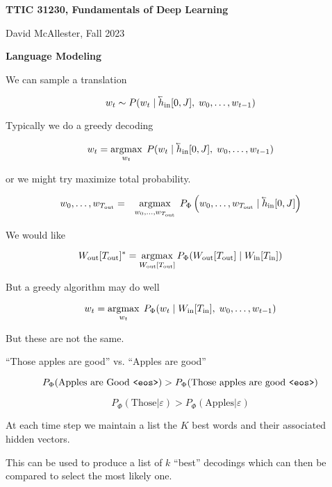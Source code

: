




{\Huge

  \centerline{\bf TTIC 31230, Fundamentals of Deep Learning}
  \bigskip
  \centerline{David McAllester, Fall 2023}
  \vfill
  \centerline{\bf Language Modeling}


We can sample a translation

$$w_t \sim P(w_t\;|\;\cev{h}_{\mathrm{in}}[0,J],\;w_0,\ldots,w_{t-1})$$

\vfill
Typically we do a greedy decoding

$$w_t = \argmax_{w_t}\; P(w_t\;|\;\cev{h}_{\mathrm{in}}[0,J],\;w_0,\ldots,w_{t-1})$$

\vfill
or we might try maximize total probability.

\begin{eqnarray*}
w_0,\ldots,w_{T_{\mathrm{out}}}
& = & \argmax_{w_0,\ldots,w_{T_{\mathrm{out}}}} \;P_\Phi\left(w_0,\ldots,w_{T_{\mathrm{out}}} \;|\; \cev{h}_{\mathrm{in}}[0,J]\right)
\end{eqnarray*}


We would like

\vfill
$$W_{\mathrm{out}}[T_{\mathrm{out}}]^* = \operatorname*{argmax}_{W_{\mathrm{out}}[T_{\mathrm{out}}]}
P_\Phi(W_{\mathrm{out}}[T_{\mathrm{out}}] \;|\;W_{\mathrm{in}}[T_{\mathrm{in}}])$$

\vfill
But a greedy algorithm may do well

\vfill
$$w_t = \operatorname*{argmax}_{w_t}\; P_\Phi(w_t\;|\;W_{\mathrm{in}}[T_{\mathrm{in}}],\;w_0,\ldots,w_{t-1})$$

\vfill
But these are not the same.


``Those apples are good'' vs. ``Apples are good''

\vfill
$$P_\Phi(\mbox{Apples are Good {\tt <eos>}}) > P_\Phi(\mbox{Those apples are good {\tt <eos>}})$$

\vfill
$$P_\Phi(\mbox{Those}|\varepsilon) > P_\Phi(\mbox{Apples}|\varepsilon)$$
    

At each time step we maintain a list the $K$ best words and their associated hidden vectors.

\vfill
This can be used to produce a list of $k$ ``best'' decodings which can then be compared to select
the most likely one.

}
